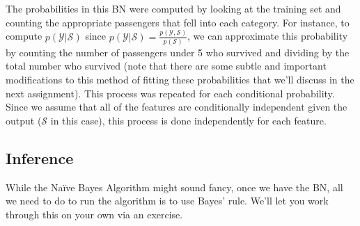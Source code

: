 \documentclass[assignment03_Solutions]{subfiles}
\begin{document}
The probabilities in this BN were computed by looking at the training set and counting the appropriate passengers that fell into each category.  For instance, to compute $p(\mathcal{Y}|\mathcal{S})$ since $p(\mathcal{Y}|\mathcal{S}) = \frac{p(\mathcal{Y}, \mathcal{S})}{p(\mathcal{S})}$, we can approximate this probability by counting the number of passengers under 5 who survived and dividing by the total number who survived (note that there are some subtle and important modifications to this method of fitting these probabilities that we'll discuss in the next assignment).  This process was repeated for each conditional probability.  Since we assume that all of the features are conditionally independent given the output ($\mathcal{S}$ in this case), this process is done independently for each feature.

\subsection{Inference}
While the Na\"ive Bayes Algorithm might sound fancy, once we have the BN, all we need to do to run the algorithm is to use Bayes' rule.  We'll let you work through this on your own via an exercise.
\end{document}
